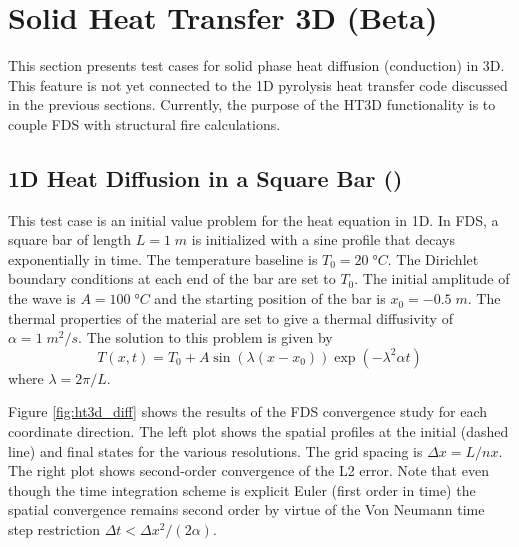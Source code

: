 \documentclass[11pt]{book}
\begin{document}
\section{Solid Heat Transfer 3D (Beta)}
\label{sec:ht3d}

This section presents test cases for solid phase heat diffusion (conduction) in 3D.  This feature is not yet connected to the 1D pyrolysis heat transfer code discussed in the previous sections.  Currently, the purpose of the HT3D functionality is to couple FDS with structural fire calculations.

\subsection{1D Heat Diffusion in a Square Bar (\texorpdfstring{}{ht3d\_nx\_x})}
\label{sec:heat_diff}
\label{ht3d_nx_10,ht3d_nx_20,ht3d_nx_40,ht3d_nx_80,ht3d_nx_160}
\label{ht3d_ny_10,ht3d_ny_20,ht3d_ny_40,ht3d_ny_80,ht3d_ny_160}
\label{ht3d_nz_10,ht3d_nz_20,ht3d_nz_40,ht3d_nz_80,ht3d_nz_160}

This test case is an initial value problem for the heat equation in 1D.  In FDS, a square bar of length $L=1\;\si{m}$ is initialized with a sine profile that decays exponentially in time.  The temperature baseline is $T_0 = 20 \;\si{\degree C}$.  The Dirichlet boundary conditions at each end of the bar are set to $T_0$.  The initial amplitude of the wave is $A = 100 \;\si{\degree C}$ and the starting position of the bar is $x_0 = -0.5 \;\si{m}$.  The thermal properties of the material are set to give a thermal diffusivity of $\alpha = 1 \;\si{m^2/s}$.  The solution to this problem is given by \cite{Crank:1}
\begin{equation}
\label{eq:expdecay}
T(x,t) = T_0 + A \sin(\lambda(x-x_0)) \exp(-\lambda^2 \alpha t)
\end{equation}
where $\lambda = 2\pi/L$.

Figure \ref{fig:ht3d_diff} shows the results of the FDS convergence study for each coordinate direction.  The left plot shows the spatial profiles at the initial (dashed line) and final states for the various resolutions.  The grid spacing is $\Delta x = L/nx$.  The right plot shows second-order convergence of the L2 error.  Note that even though the time integration scheme is explicit Euler (first order in time) the spatial convergence remains second order by virtue of the Von Neumann time step restriction $\Delta t < \Delta x^2/(2\alpha)$.
\end{document}
